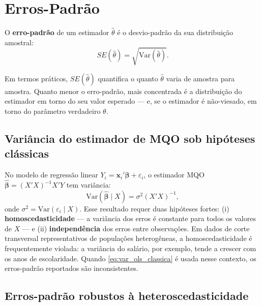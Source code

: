 \section{Erros-Padrão}
\label{sec:erros_padrao}

O \textbf{erro-padrão} de um estimador $\hat{\theta}$ é o desvio-padrão da sua distribuição amostral:
\begin{equation}
  SE(\hat{\theta}) = \sqrt{\text{Var}(\hat{\theta})}.
  \label{eq:se_definicao}
\end{equation}

Em termos práticos, $SE(\hat{\theta})$ quantifica o quanto $\hat{\theta}$ varia de amostra para amostra. Quanto menor o erro-padrão, mais concentrada é a distribuição do estimador em torno do seu valor esperado — e, se o estimador é não-viesado, em torno do parâmetro verdadeiro $\theta$.

\subsection*{Variância do estimador de MQO sob hipóteses clássicas}

No modelo de regressão linear $Y_i = \boldsymbol{x}_i'\boldsymbol{\beta} + \varepsilon_i$, o estimador MQO $\hat{\boldsymbol{\beta}} = (X'X)^{-1}X'Y$ tem variância:
\begin{equation}
  \text{Var}(\hat{\boldsymbol{\beta}} \mid X) = \sigma^2 (X'X)^{-1},
  \label{eq:var_ols_classica}
\end{equation}
onde $\sigma^2 = \text{Var}(\varepsilon_i \mid X)$. Esse resultado requer duas hipóteses fortes: (i) \textbf{homoscedasticidade} — a variância dos erros é constante para todos os valores de $X$ — e (ii) \textbf{independência} dos erros entre observações. Em dados de corte transversal representativos de populações heterogêneas, a homoscedasticidade é frequentemente violada: a variância do salário, por exemplo, tende a crescer com os anos de escolaridade. Quando \eqref{eq:var_ols_classica} é usada nesse contexto, os erros-padrão reportados são inconsistentes.

\subsection*{Erros-padrão robustos à heteroscedasticidade}

